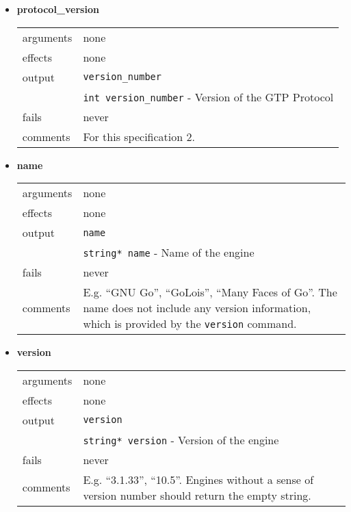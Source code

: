 \documentclass[a4paper]{article}
\begin{document}
\begin{itemize}
\item \textbf{protocol\_version} \\
  \begin{tabularx}{\linewidth}{lX}
    arguments & none \\
    effects &   none \\
    output &    \texttt{version\_number} \\
    & \texttt{int version\_number}  - Version of the GTP Protocol \\
    fails &     never \\
    comments &  For this specification 2.
  \end{tabularx}

\newpage
\item \textbf{name} \\
  \begin{tabularx}{\linewidth}{lX}
    arguments & none \\
    effects &   none \\
    output &    \texttt{name} \\
    & \texttt{string* name} - Name of the engine \\
    fails &     never \\
    comments &  E.g. ``GNU Go'', ``GoLois'', ``Many Faces of Go''. The
    name does not include any version information, which is provided by
    the \texttt{version} command.\\
  \end{tabularx}

\item \textbf{version} \\
  \begin{tabularx}{\linewidth}{lX}
    arguments & none \\
    effects &   none \\
    output &    \texttt{version} \\
    & \texttt{string* version} - Version of the engine \\
    fails &     never \\
    comments &  E.g. ``3.1.33'', ``10.5''. Engines without a sense of version
                number should return the empty string. \\
  \end{tabularx}


\end{itemize}
\end{document}
